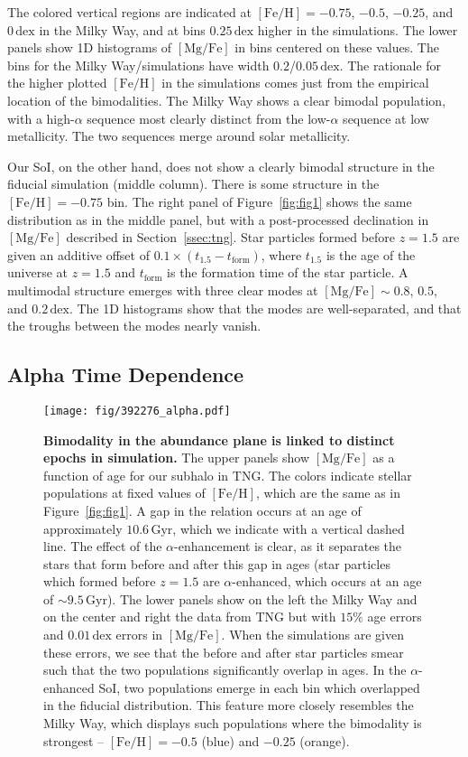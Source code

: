\documentclass[twocolumn]{aastex631}
\newcommand{\Gyr}{\ensuremath{\textrm{Gyr}}}
\newcommand{\FeH}{\ensuremath{[\textrm{Fe}/\textrm{H}]}}
\newcommand{\MgFe}{\ensuremath{[\textrm{Mg}/\textrm{Fe}]}}
\newcommand{\dex}{\ensuremath{\textrm{dex}}}
\begin{document}
The colored vertical regions are indicated at $\FeH=-0.75$, $-0.5$, $-0.25$, and $0\,\dex$ in the Milky Way, and at bins $0.25\,\dex$ higher in the simulations. The lower panels show 1D histograms of \MgFe{} in bins centered on these values. The bins for the Milky Way/simulations have width $0.2$/$0.05\,\dex$. The rationale for the higher plotted \FeH{} in the simulations comes just from the empirical location of the bimodalities. The Milky Way shows a clear bimodal population, with a high-$\alpha$ sequence most clearly distinct from the low-$\alpha$ sequence at low metallicity. The two sequences merge around solar metallicity.

Our SoI, on the other hand, does not show a clearly bimodal structure in the fiducial simulation (middle column). There is some structure in the $\FeH=-0.75$ bin. The right panel of Figure~\ref{fig:fig1} shows the same distribution as in the middle panel, but with a post-processed declination in \MgFe{} described in Section~\ref{ssec:tng}. Star particles formed before $z=1.5$ are given an additive offset of $0.1\times\left(t_{1.5}-t_{\textrm{form}}\right)$, where $t_{1.5}$ is the age of the universe at $z=1.5$ and $t_{\textrm{form}}$ is the formation time of the star particle. A multimodal structure emerges with three clear modes at $\MgFe\sim0.8$, $0.5$, and $0.2\,\dex$. The 1D histograms show that the modes are well-separated, and that the troughs between the modes nearly vanish.

\subsection{Alpha Time Dependence}\label{ssec:alpha_time}

\begin{figure*}
  \centering
  \texttt{[image: fig/392276\_alpha.pdf]}
  \caption{\textbf{Bimodality in the abundance plane is linked to distinct epochs in simulation.} The upper panels show \MgFe{} as a function of age for our subhalo in TNG. The colors indicate stellar populations at fixed values of \FeH{}, which are the same as in Figure~\ref{fig:fig1}. A gap in the relation occurs at an age of approximately $10.6\,\Gyr$, which we indicate with a vertical dashed line. The effect of the $\alpha$-enhancement is clear, as it separates the stars that form before and after this gap in ages (star particles which formed before $z=1.5$ are $\alpha$-enhanced, which occurs at an age of $\sim9.5\,\Gyr$). The lower panels show on the left the Milky Way and on the center and right the data from TNG but with $15\%$ age errors and $0.01\,\dex$ errors in \MgFe{}. When the simulations are given these errors, we see that the before and after star particles smear such that the two populations significantly overlap in ages. In the $\alpha$-enhanced SoI, two populations emerge in each bin which overlapped in the fiducial distribution. This feature more closely resembles the Milky Way, which displays such populations where the bimodality is strongest -- $\FeH=-0.5$ (blue) and $-0.25$ (orange).}
  \label{fig:alpha}
\end{figure*}
\end{document}
